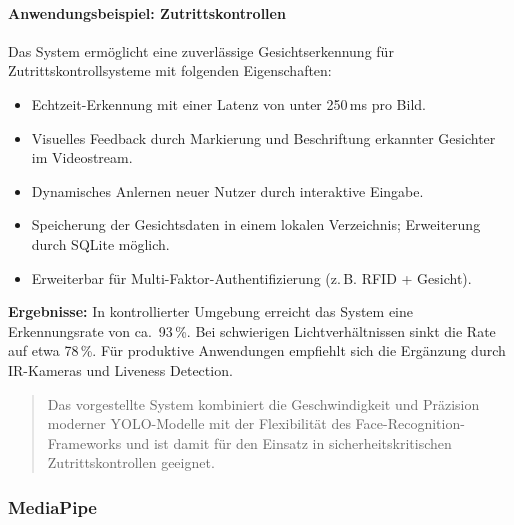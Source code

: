 \paragraph{Anwendungsbeispiel: Zutrittskontrollen}
Das System ermöglicht eine zuverlässige Gesichtserkennung für Zutrittskontrollsysteme mit folgenden Eigenschaften:
\begin{itemize}
    \item Echtzeit-Erkennung mit einer Latenz von unter 250\,ms pro Bild.
    \item Visuelles Feedback durch Markierung und Beschriftung erkannter Gesichter im Videostream.
    \item Dynamisches Anlernen neuer Nutzer durch interaktive Eingabe.
    \item Speicherung der Gesichtsdaten in einem lokalen Verzeichnis; Erweiterung durch SQLite möglich.
    \item Erweiterbar für Multi-Faktor-Authentifizierung (z.\,B. RFID + Gesicht).
\end{itemize}

\textbf{Ergebnisse:} In kontrollierter Umgebung erreicht das System eine Erkennungsrate von ca.~93\,\%. Bei schwierigen Lichtverhältnissen sinkt die Rate auf etwa 78\,\%. Für produktive Anwendungen empfiehlt sich die Ergänzung durch IR-Kameras und Liveness Detection.

\begin{quote}
Das vorgestellte System kombiniert die Geschwindigkeit und Präzision moderner YOLO-Modelle mit der Flexibilität des Face-Recognition-Frameworks und ist damit für den Einsatz in sicherheitskritischen Zutrittskontrollen geeignet.
\end{quote}

\subsubsection{MediaPipe}
